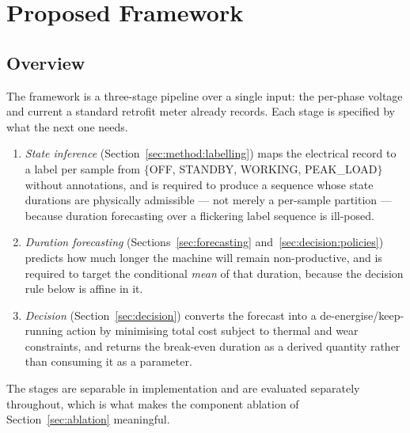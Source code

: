 %
%
%

\section{Proposed Framework}
\label{sec:method}

\subsection{Overview}
\label{sec:method:overview}

The framework is a three-stage pipeline over a single input: the
per-phase voltage and current a standard retrofit meter already
records. Each stage is specified by what the next one needs.

\begin{enumerate}
\item \emph{State inference} (Section~\ref{sec:method:labelling}) maps
  the electrical record to a label per sample from
  $\{$OFF, STANDBY, WORKING, PEAK\_LOAD$\}$ without annotations, and is
  required to produce a sequence whose state durations are physically
  admissible --- not merely a per-sample partition --- because duration
  forecasting over a flickering label sequence is ill-posed.
\item \emph{Duration forecasting} (Sections~\ref{sec:forecasting}
  and~\ref{sec:decision:policies}) predicts how much longer the machine
  will remain non-productive, and is required to target the conditional
  \emph{mean} of that duration, because the decision rule below is
  affine in it.
\item \emph{Decision} (Section~\ref{sec:decision}) converts the forecast
  into a de-energise/keep-running action by minimising total cost
  subject to thermal and wear constraints, and returns the break-even
  duration as a derived quantity rather than consuming it as a
  parameter.
\end{enumerate}

The stages are separable in implementation and are evaluated separately
throughout, which is what makes the component ablation of
Section~\ref{sec:ablation} meaningful.

